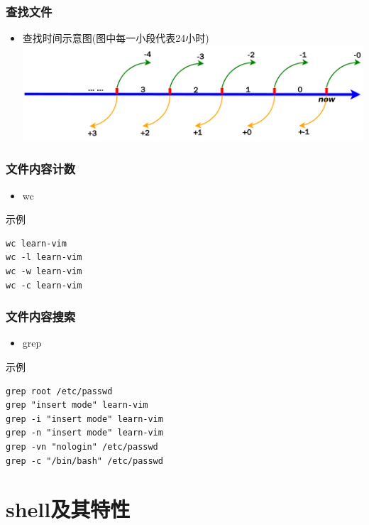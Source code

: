 \documentclass[xcolor=svgnames,presentation]{beamer}
\begin{document}
\begin{frame}
\frametitle{查找文件}
\label{sec-1-1-9}
\begin{itemize}

\item 查找时间示意图(图中每一小段代表24小时)\\
\label{sec-1-1-9-1}%
\includegraphics[width=.9\linewidth]{img/find-time.pdf}
\end{itemize} %
\end{frame}
\begin{frame}[fragile]
\frametitle{文件内容计数}
\label{sec-1-1-10}
\begin{itemize}

\item wc
\label{sec-1-1-10-1}%
\end{itemize} %
\begin{exampleblock}{示例}
\label{sec-1-1-10-2}


\begin{verbatim}
wc learn-vim
wc -l learn-vim
wc -w learn-vim
wc -c learn-vim
\end{verbatim}
\end{exampleblock}
\end{frame}
\begin{frame}[fragile]
\frametitle{文件内容搜索}
\label{sec-1-1-11}
\begin{itemize}

\item grep
\label{sec-1-1-11-1}%
\end{itemize} %
\begin{exampleblock}{示例}
\label{sec-1-1-11-2}


\begin{verbatim}
grep root /etc/passwd
grep "insert mode" learn-vim
grep -i "insert mode" learn-vim
grep -n "insert mode" learn-vim
grep -vn "nologin" /etc/passwd
grep -c "/bin/bash" /etc/passwd
\end{verbatim}
\end{exampleblock}
\end{frame}
\section{shell及其特性}
\label{sec-2}
\end{document}
